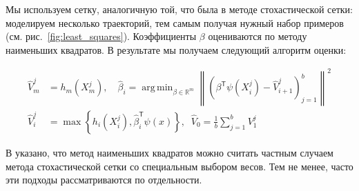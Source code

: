 \documentclass[specialist,
               substylefile = ../spbu.rtx,
               subf,href,colorlinks=true, 12pt]{disser}
\newcommand{\R}{\ensuremath{\mathbb{R}}}
\newcommand{\norm}[1]{\left\lVert#1\right\rVert}
\newcommand{\Vhat}{\hat{V}}
\newcommand{\maxset}[1]{\max\left\lbrace#1\right\rbrace}
\DeclareMathOperator*{\argmin}{arg\,min}
\begin{document}
Мы используем сетку, аналогичную той, что была в методе стохастической сетки: моделируем несколько траекторий, тем самым получая нужный набор примеров (см. рис.~\ref{fig:least_squares}). Коэффициенты $\beta$ оцениваются по методу наименьших квадратов. В результате мы получаем следующий алгоритм оценки:

\begin{equation}
	\begin{aligned}
	\Vhat_m^j &= h_m(X_m^j), \quad \hat\beta_i = \argmin_{\beta\in\R^m} \norm{\left(\beta^\mathsf{T}\psi(X_i^j) - \Vhat_{i+1}^j\right)_{j=1}^b}^2 \\
		\Vhat_i^j &= \maxset{h_i(X_i^j), \hat \beta_i^\mathsf{T}\psi(x)},\;\; \Vhat_0 = \frac{1}{b}\sum_{j=1}^b V_1^j\end{aligned}\label{eq:least_squares}
\end{equation}

В \cite{Glasserman2004} указано, что метод наименьших квадратов можно считать частным случаем метода стохастической сетки со специальным выбором весов. Тем не менее, часто эти подходы рассматриваются по отдельности.









\end{document}
